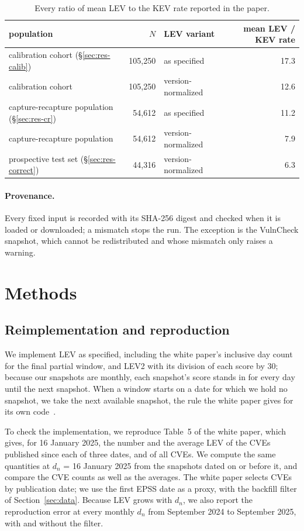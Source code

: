 \begin{table}[t]
\centering\small
\caption{Every ratio of mean LEV to the KEV rate reported in the paper.}\label{tab:ratios}
\begin{tabular}{@{}lrlr@{}}
\toprule
population & $N$ & LEV variant & mean LEV / KEV rate \\
\midrule
calibration cohort (\S\ref{sec:res-calib}) & 105,250 & as specified & 17.3\x \\
calibration cohort & 105,250 & version-normalized & 12.6\x \\
capture-recapture population (\S\ref{sec:res-cr}) & 54,612 & as specified & 11.2\x \\
capture-recapture population & 54,612 & version-normalized & 7.9\x \\
prospective test set (\S\ref{sec:res-correct}) & 44,316 & version-normalized & 6.3\x \\
\bottomrule
\end{tabular}
\end{table}

\paragraph{Provenance.} Every fixed input is recorded with its SHA-256 digest
and checked when it is loaded or downloaded; a mismatch stops the run. The
exception is the VulnCheck snapshot, which cannot be redistributed and whose
mismatch only raises a warning.

\section{Methods}\label{sec:methods}

\subsection{Reimplementation and reproduction}\label{sec:m-repro}

We implement LEV as specified, including the white paper's inclusive day count
for the final partial window, and LEV2 with its division of each score by 30;
because our snapshots are monthly, each snapshot's score stands in for every
day until the next snapshot. When a window starts on a date for which we hold no snapshot, we take
the next available snapshot, the rule the white paper gives for its own
code~\cite[Sec.~10.3]{mell2025lev}.

To check the implementation, we reproduce Table~5 of the white paper, which
gives, for 16 January 2025, the number and the average LEV of the CVEs
published since each of three dates, and of all CVEs. We compute the same
quantities at $d_n$ = 16 January 2025 from the snapshots dated on or before
it, and compare the CVE counts as well as the averages. The white paper
selects CVEs by publication date; we use the first EPSS date as a proxy, with
the backfill filter of Section~\ref{sec:data}. Because LEV grows with $d_n$,
we also report the reproduction error at every monthly $d_n$ from September
2024 to September 2025, with and without the filter.

